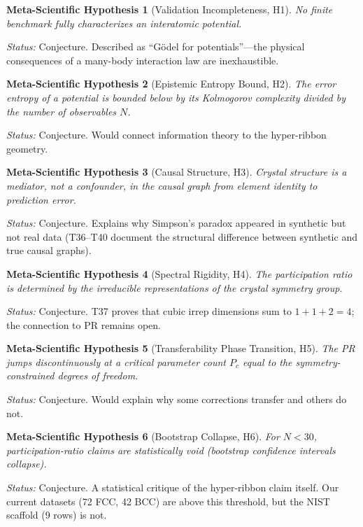 \documentclass[11pt,a4paper]{article}
\theoremstyle{definition}
\theoremstyle{plain}
\newtheorem{hypothesis}{Meta-Scientific Hypothesis}[section]
\begin{document}
\begin{hypothesis}[Validation Incompleteness, H1]
\label{hyp:h1}
No finite benchmark fully characterizes an interatomic potential.
\end{hypothesis}
\textit{Status:} Conjecture. Described as ``G\"odel for potentials''---the physical consequences of a many-body interaction law are inexhaustible.

\begin{hypothesis}[Epistemic Entropy Bound, H2]
\label{hyp:h2}
The error entropy of a potential is bounded below by its Kolmogorov complexity divided by the number of observables $N$.
\end{hypothesis}
\textit{Status:} Conjecture. Would connect information theory to the hyper-ribbon geometry.

\begin{hypothesis}[Causal Structure, H3]
\label{hyp:h3}
Crystal structure is a mediator, not a confounder, in the causal graph from element identity to prediction error.
\end{hypothesis}
\textit{Status:} Conjecture. Explains why Simpson's paradox appeared in synthetic but not real data (T36--T40 document the structural difference between synthetic and true causal graphs).

\begin{hypothesis}[Spectral Rigidity, H4]
\label{hyp:h4}
The participation ratio is determined by the irreducible representations of the crystal symmetry group.
\end{hypothesis}
\textit{Status:} Conjecture. T37 proves that cubic irrep dimensions sum to $1+1+2=4$; the connection to PR remains open.

\begin{hypothesis}[Transferability Phase Transition, H5]
\label{hyp:h5}
The PR jumps discontinuously at a critical parameter count $P_c$ equal to the symmetry-constrained degrees of freedom.
\end{hypothesis}
\textit{Status:} Conjecture. Would explain why some corrections transfer and others do not.

\begin{hypothesis}[Bootstrap Collapse, H6]
\label{hyp:h6}
For $N < 30$, participation-ratio claims are statistically void (bootstrap confidence intervals collapse).
\end{hypothesis}
\textit{Status:} Conjecture. A statistical critique of the hyper-ribbon claim itself. Our current datasets (72 FCC, 42 BCC) are above this threshold, but the NIST scaffold (9 rows) is not.
\end{document}
